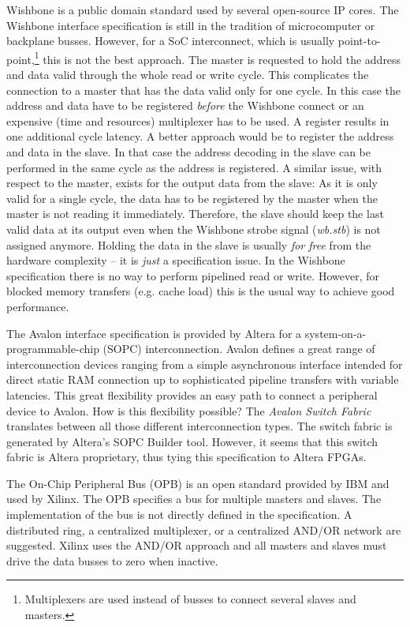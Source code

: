 Wishbone \cite{soc:wishbone} is a public domain standard used by
several open-source IP cores. The Wishbone interface specification is
still in the tradition of microcomputer or backplane busses. However,
for a SoC interconnect, which is usually
point-to-point,\footnote{Multiplexers are used instead of busses to
connect several slaves and masters.} this is not the best approach.
The master is requested to hold the address and data valid through
the whole read or write cycle. This complicates the connection to a
master that has the data valid only for one cycle. In this case the
address and data have to be registered \emph{before} the Wishbone
connect or an expensive (time and resources) multiplexer has to be
used. A register results in one additional cycle latency. A better
approach would be to register the address and data in the slave. In
that case the address decoding in the slave can be performed in the
same cycle as the address is registered. A similar issue, with
respect to the master, exists for the output data from the slave: As
it is only valid for a single cycle, the data has to be registered by
the master when the master is not reading it immediately. Therefore,
the slave should keep the last valid data at its output even when the
Wishbone strobe signal (\emph{wb.stb}) is not assigned anymore.
Holding the data in the slave is usually \emph{for free} from the
hardware complexity -- it is \emph{just} a specification issue. In
the Wishbone specification there is no way to perform pipelined read
or write. However, for blocked memory transfers (e.g. cache load)
this is the usual way to achieve good performance.


The Avalon \cite{soc:avalon} interface specification is provided by
Altera for a system-on-a-programmable-chip (SOPC) interconnection.
Avalon defines a great range of interconnection devices ranging from
a simple asynchronous interface intended for direct static RAM
connection up to sophisticated pipeline transfers with variable
latencies. This great flexibility provides an easy path to connect a
peripheral device to Avalon. How is this flexibility possible? The
\emph{Avalon Switch Fabric} translates between all those different
interconnection types. The switch fabric is generated by Altera's
SOPC Builder tool. However, it seems that this switch fabric is
Altera proprietary, thus tying this specification to Altera FPGAs.

The On-Chip Peripheral Bus (OPB) \cite{soc:opb} is an open standard
provided by IBM and used by Xilinx. The OPB specifies a bus for
multiple masters and slaves. The implementation of the bus is not
directly defined in the specification. A distributed ring, a
centralized multiplexer, or a centralized AND/OR network are
suggested. Xilinx uses the AND/OR approach and all masters and
slaves must drive the data busses to zero when inactive.


